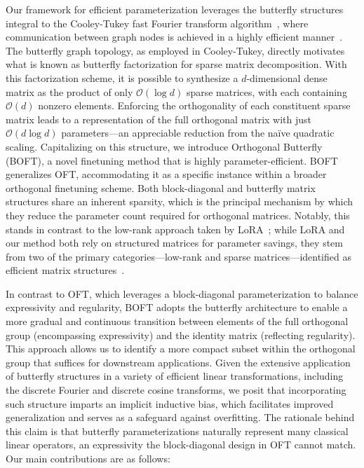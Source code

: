 Our framework for efficient parameterization leverages the butterfly structures integral to the Cooley-Tukey fast Fourier transform algorithm~\cite{cooley1965algorithm}, where communication between graph nodes is achieved in a highly efficient manner~\cite{klasing1994broadcasting}. The butterfly graph topology, as employed in Cooley-Tukey, directly motivates what is known as butterfly factorization for sparse matrix decomposition. With this factorization scheme, it is possible to synthesize a $d$-dimensional dense matrix as the product of only $\mathcal{O}(\log d)$ sparse matrices, with each containing $\mathcal{O}(d)$ nonzero elements. Enforcing the orthogonality of each constituent sparse matrix leads to a representation of the full orthogonal matrix with just $\mathcal{O}(d\log d)$ parameters—an appreciable reduction from the naïve quadratic scaling. Capitalizing on this structure, we introduce Orthogonal Butterfly (BOFT), a novel finetuning method that is highly parameter-efficient. BOFT generalizes OFT, accommodating it as a specific instance within a broader orthogonal finetuning scheme. Both block-diagonal and butterfly matrix structures share an inherent sparsity, which is the principal mechanism by which they reduce the parameter count required for orthogonal matrices. Notably, this stands in contrast to the low-rank approach taken by LoRA~\cite{hulora2022}; while LoRA and our method both rely on structured matrices for parameter savings, they stem from two of the primary categories—low-rank and sparse matrices—identified as efficient matrix structures~\cite{candes2011robust}.

In contrast to OFT, which leverages a block-diagonal parameterization to balance expressivity and regularity, BOFT adopts the butterfly architecture to enable a more gradual and continuous transition between elements of the full orthogonal group (encompassing expressivity) and the identity matrix (reflecting regularity). This approach allows us to identify a more compact subset within the orthogonal group that suffices for downstream applications. Given the extensive application of butterfly structures in a variety of efficient linear transformations, including the discrete Fourier and discrete cosine transforms, we posit that incorporating such structure imparts an implicit inductive bias, which facilitates improved generalization and serves as a safeguard against overfitting. The rationale behind this claim is that butterfly parameterizations naturally represent many classical linear operators, an expressivity the block-diagonal design in OFT cannot match. Our main contributions are as follows:

